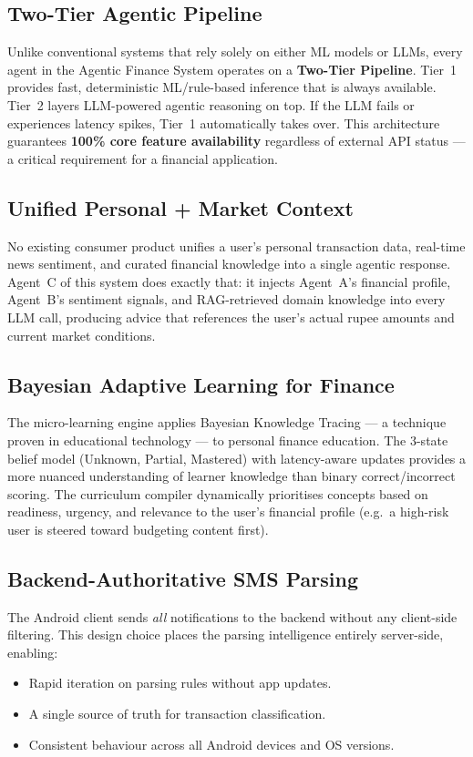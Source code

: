 \documentclass[12pt,a4paper]{article}
\begin{document}
\subsection{Two-Tier Agentic Pipeline}
Unlike conventional systems that rely solely on either ML models or LLMs, every agent in the Agentic Finance System operates on a \textbf{Two-Tier Pipeline}. Tier~1 provides fast, deterministic ML/rule-based inference that is always available. Tier~2 layers LLM-powered agentic reasoning on top. If the LLM fails or experiences latency spikes, Tier~1 automatically takes over. This architecture guarantees \textbf{100\% core feature availability} regardless of external API status --- a critical requirement for a financial application.

\subsection{Unified Personal + Market Context}
No existing consumer product unifies a user's personal transaction data, real-time news sentiment, and curated financial knowledge into a single agentic response. Agent~C of this system does exactly that: it injects Agent~A's financial profile, Agent~B's sentiment signals, and RAG-retrieved domain knowledge into every LLM call, producing advice that references the user's actual rupee amounts and current market conditions.

\subsection{Bayesian Adaptive Learning for Finance}
The micro-learning engine applies Bayesian Knowledge Tracing --- a technique proven in educational technology --- to personal finance education. The 3-state belief model (Unknown, Partial, Mastered) with latency-aware updates provides a more nuanced understanding of learner knowledge than binary correct/incorrect scoring. The curriculum compiler dynamically prioritises concepts based on readiness, urgency, and relevance to the user's financial profile (e.g.\ a high-risk user is steered toward budgeting content first).

\subsection{Backend-Authoritative SMS Parsing}
The Android client sends \emph{all} notifications to the backend without any client-side filtering. This design choice places the parsing intelligence entirely server-side, enabling:
\begin{itemize}[leftmargin=1.5em]
  \item Rapid iteration on parsing rules without app updates.
  \item A single source of truth for transaction classification.
  \item Consistent behaviour across all Android devices and OS versions.
\end{itemize}
\end{document}

